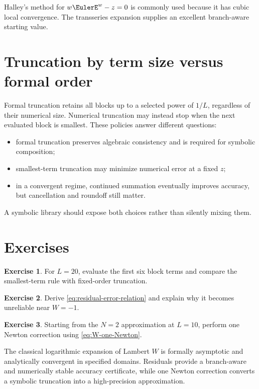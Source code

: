 \documentclass[11pt,openany]{book}
\theoremstyle{definition}
\newtheorem{exercise}{Exercise}[chapter]
\theoremstyle{plain}
\theoremstyle{remark}
\begin{document}
Halley's method for \(w\EulerE^w-z=0\) is commonly used because it has cubic local convergence. The transseries expansion supplies an excellent branch-aware starting value.

\section{Truncation by term size versus formal order}
Formal truncation retains all blocks up to a selected power of \(1/L\), regardless of their numerical size. Numerical truncation may instead stop when the next evaluated block is smallest. These policies answer different questions:
\begin{itemize}
\item formal truncation preserves algebraic consistency and is required for symbolic composition;
\item smallest-term truncation may minimize numerical error at a fixed \(z\);
\item in a convergent regime, continued summation eventually improves accuracy, but cancellation and roundoff still matter.
\end{itemize}
A symbolic library should expose both choices rather than silently mixing them.

\section{Exercises}
\begin{exercise}
For \(L=20\), evaluate the first six block terms and compare the smallest-term rule with fixed-order truncation.
\end{exercise}
\begin{exercise}
Derive \cref{eq:residual-error-relation} and explain why it becomes unreliable near \(W=-1\).
\end{exercise}
\begin{exercise}
Starting from the \(N=2\) approximation at \(L=10\), perform one Newton correction using \cref{eq:W-one-Newton}.
\end{exercise}

\begin{summarybox}
The classical logarithmic expansion of Lambert \(W\) is formally asymptotic and analytically convergent in specified domains. Residuals provide a branch-aware and numerically stable accuracy certificate, while one Newton correction converts a symbolic truncation into a high-precision approximation.
\end{summarybox}
\end{document}

